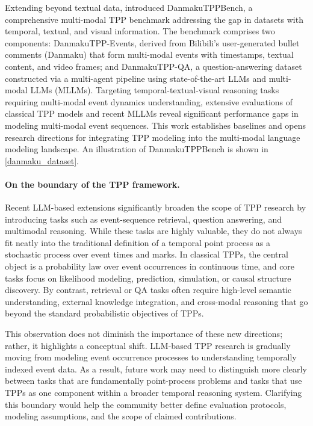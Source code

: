\documentclass[10pt]{article} %
\begin{document}
Extending beyond textual data, \citet{jiang2025danmakutppbench} introduced {DanmakuTPPBench}, a comprehensive multi-modal TPP benchmark addressing the gap in datasets with temporal, textual, and visual information. The benchmark comprises two components: {DanmakuTPP-Events}, derived from Bilibili's user-generated bullet comments (Danmaku) that form multi-modal events with timestamps, textual content, and video frames; and {DanmakuTPP-QA}, a question-answering dataset constructed via a multi-agent pipeline using state-of-the-art LLMs and multi-modal LLMs (MLLMs). Targeting temporal-textual-visual reasoning tasks requiring multi-modal event dynamics understanding, extensive evaluations of classical TPP models and recent MLLMs reveal significant performance gaps in modeling multi-modal event sequences. This work establishes baselines and opens research directions for integrating TPP modeling into the multi-modal language modeling landscape.
An illustration of DanmakuTPPBench is shown in \cref{danmaku_dataset}. 

\paragraph{On the boundary of the TPP framework.}
Recent LLM-based extensions significantly broaden the scope of TPP research by introducing tasks such as event-sequence retrieval, question answering, and multimodal reasoning. While these tasks are highly valuable, they do not always fit neatly into the traditional definition of a temporal point process as a stochastic process over event times and marks. In classical TPPs, the central object is a probability law over event occurrences in continuous time, and core tasks focus on likelihood modeling, prediction, simulation, or causal structure discovery. By contrast, retrieval or QA tasks often require high-level semantic understanding, external knowledge integration, and cross-modal reasoning that go beyond the standard probabilistic objectives of TPPs.

This observation does not diminish the importance of these new directions; rather, it highlights a conceptual shift. LLM-based TPP research is gradually moving from modeling event occurrence processes to understanding temporally indexed event data. As a result, future work may need to distinguish more clearly between tasks that are fundamentally point-process problems and tasks that use TPPs as one component within a broader temporal reasoning system. Clarifying this boundary would help the community better define evaluation protocols, modeling assumptions, and the scope of claimed contributions.
\end{document}
